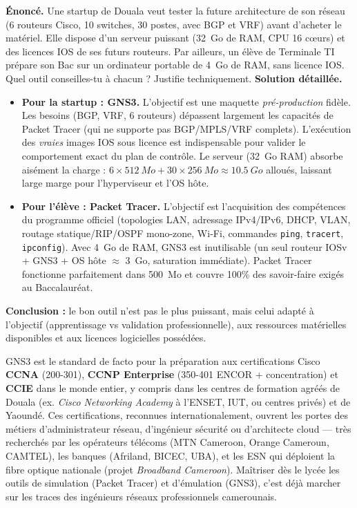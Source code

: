 \documentclass[11pt]{article}
\begin{document}
\begin{exoresolu}
\textbf{Énoncé.} Une startup de Douala veut tester la future architecture de son réseau (6 routeurs Cisco, 10 switches, 30 postes, avec BGP et VRF) avant d'acheter le matériel. Elle dispose d'un serveur puissant (\SI{32}{Go} de RAM, CPU 16 cœurs) et des licences IOS de ses futurs routeurs. Par ailleurs, un élève de Terminale TI prépare son Bac sur un ordinateur portable de \SI{4}{Go} de RAM, sans licence IOS. Quel outil conseilles-tu à chacun ? Justifie techniquement.
\tcblower
\textbf{Solution détaillée.}
\begin{itemize}
    \item \textbf{Pour la startup : GNS3.} L'objectif est une maquette \emph{pré-production} fidèle. Les besoins (BGP, VRF, 6 routeurs) dépassent largement les capacités de Packet Tracer (qui ne supporte pas BGP/MPLS/VRF complets). L'exécution des \emph{vraies} images IOS sous licence est indispensable pour valider le comportement exact du plan de contrôle. Le serveur (\SI{32}{Go} RAM) absorbe aisément la charge : $6 \times \SI{512}{Mo} + 30 \times \SI{256}{Mo} \approx \SI{10,5}{Go}$ alloués, laissant large marge pour l'hyperviseur et l'OS hôte.
    \item \textbf{Pour l'élève : Packet Tracer.} L'objectif est l'acquisition des compétences du programme officiel (topologies LAN, adressage IPv4/IPv6, DHCP, VLAN, routage statique/RIP/OSPF mono-zone, Wi-Fi, commandes \texttt{ping}, \texttt{tracert}, \texttt{ipconfig}). Avec \SI{4}{Go} de RAM, GNS3 est inutilisable (un seul routeur IOSv + GNS3 + OS hôte $\approx$ \SI{3}{Go}, saturation immédiate). Packet Tracer fonctionne parfaitement dans \SI{500}{Mo} et couvre 100\% des savoir-faire exigés au Baccalauréat.
\end{itemize}
\textbf{Conclusion :} le bon outil n'est pas le plus puissant, mais celui adapté à l'objectif (apprentissage vs validation professionnelle), aux ressources matérielles disponibles et aux licences logicielles possédées.
\end{exoresolu}

\begin{savaistu}
GNS3 est le standard de facto pour la préparation aux certifications Cisco \textbf{CCNA} (200-301), \textbf{CCNP Enterprise} (350-401 ENCOR + concentration) et \textbf{CCIE} dans le monde entier, y compris dans les centres de formation agréés de Douala (ex. \emph{Cisco Networking Academy} à l'ENSET, IUT, ou centres privés) et de Yaoundé. Ces certifications, reconnues internationalement, ouvrent les portes des métiers d'administrateur réseau, d'ingénieur sécurité ou d'architecte cloud — très recherchés par les opérateurs télécoms (MTN Cameroon, Orange Cameroun, CAMTEL), les banques (Afriland, BICEC, UBA), et les ESN qui déploient la fibre optique nationale (projet \emph{Broadband Cameroon}). Maîtriser dès le lycée les outils de simulation (Packet Tracer) et d'émulation (GNS3), c'est déjà marcher sur les traces des ingénieurs réseaux professionnels camerounais.
\end{savaistu}
\end{document}
